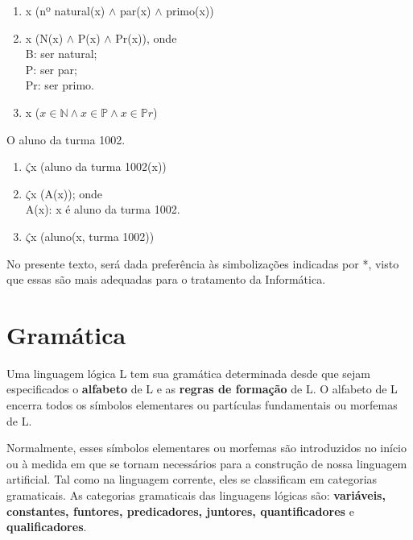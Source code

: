 \begin{enumerate}[label=(\roman*)]
    \item x (nº natural(x) $\wedge$ par(x) $\wedge$ primo(x))
    \item x (N(x) $\wedge$ P(x) $\wedge$ Pr(x)), onde\\
    B: ser natural;\\
    P: ser par;\\
    Pr: ser primo.
    \item x ($x \in \mathbb{N} \wedge x \in \mathbb{P} \wedge x \in \mathbb{P} r$)
\end{enumerate}

\bigskip

\begin{exemplo} O aluno da turma 1002.
\end{exemplo}

\begin{enumerate}[label=(\roman*)]
    \item $\zeta$x (aluno da turma 1002(x))
    \item $\zeta$x (A(x)); onde\\
    A(x): x é aluno da turma 1002.
    \item $\zeta$x (aluno(x, turma 1002))
\end{enumerate}

No presente texto, será dada preferência às simbolizações indicadas por *, visto que essas são mais adequadas para o tratamento da Informática.

\newpage

\section{Gramática}
\setcounter{exemplo}{0}

Uma linguagem lógica L tem sua gramática determinada desde que sejam especificados o \textbf{alfabeto} de L e as \textbf{regras de formação} de L.
O alfabeto de L encerra todos os símbolos elementares ou partículas fundamentais ou morfemas de L.

Normalmente, esses símbolos elementares ou morfemas são introduzidos no início ou à medida em que se tornam necessários para a construção de nossa linguagem artificial.
Tal como na linguagem corrente, eles se classificam em categorias gramaticais.
As categorias gramaticais das linguagens lógicas são: \textbf{variáveis, constantes, funtores, predicadores, juntores, quantificadores} e \textbf{qualificadores}.

